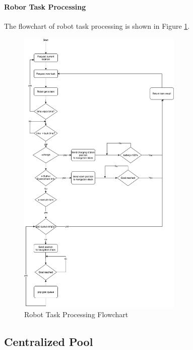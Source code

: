 \paragraph{Robor Task Processing} The flowchart of robot task processing is shown in Figure \ref{fig:robot_task_processing}.

\begin{figure}[htbp]
    \centering
    \includegraphics[width = 0.7\textwidth]{content/images/ch4/robot_task_flow.drawio.png}
    \caption{Robot Task Processing Flowchart}
    \label{fig:robot_task_processing}
\end{figure}


\subsection{Centralized Pool}



